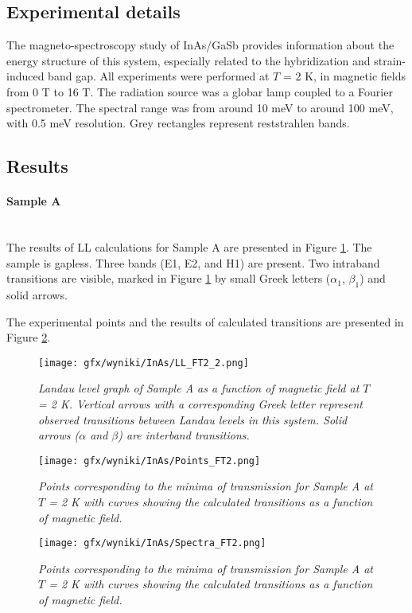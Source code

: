 \documentclass[titlepage,a4paper]{book}
\newcommand{\wciecie}{\quad\phantom{v}}
\newcommand{\myparagraph}[1]{\paragraph{#1}\mbox{}\\}
\begin{document}
\subsection{Experimental details}
\wciecie
The magneto-spectroscopy study of InAs/GaSb provides information about the energy structure of this system, especially related to the hybridization and strain-induced band gap. All experiments were performed at $T$ = 2 K, in magnetic fields from 0 T to 16 T. The radiation source was a globar lamp coupled to a Fourier spectrometer. The spectral range was from around 10 meV to around 100 meV, with 0.5 meV resolution. Grey rectangles represent reststrahlen bands.


\subsection{Results}
\myparagraph{Sample A}
\wciecie
The results of LL calculations for Sample A are presented in Figure \ref{fig:LL_FT2}. The sample is gapless. Three bands (E1, E2, and H1) are present. Two intraband transitions are visible, marked in Figure \ref{fig:LL_FT2} by small Greek letters ($\alpha_1$, $\beta_1$) and solid arrows. 

The experimental points and the results of calculated transitions are presented in Figure \ref{fig:Points_FT2}. 

\begin{figure}[ht]
	\centering
	\texttt{[image: gfx/wyniki/InAs/LL\_FT2\_2.png]}
	\vspace{-10pt}
	\caption{\textit{Landau level graph of Sample A as a function of magnetic field at $T$ = 2 K. Vertical arrows with a corresponding Greek letter represent observed transitions between Landau levels in this system. Solid arrows ($\alpha$ and $\beta$) are interband transitions.}}
	\label{fig:LL_FT2}
\end{figure}

\begin{figure}[H]
	\centering
	\texttt{[image: gfx/wyniki/InAs/Points\_FT2.png]}
	\vspace{-10pt}
	\caption{\textit{Points corresponding to the minima of transmission for Sample A at $T$ = 2 K with curves showing the calculated transitions as a function of magnetic field.}}
	\label{fig:Points_FT2}
\end{figure}

\begin{figure}[H]
	\centering
	\texttt{[image: gfx/wyniki/InAs/Spectra\_FT2.png]}
	\vspace{-10pt}
	\caption{\textit{Points corresponding to the minima of transmission for Sample A at $T$ = 2 K with curves showing the calculated transitions as a function of magnetic field.}}
	\label{fig:Spectra_FT2}
\end{figure}
\end{document}
